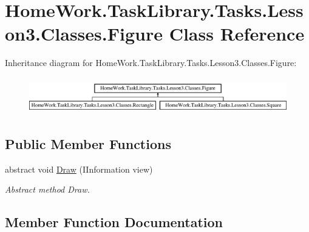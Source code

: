 \hypertarget{class_home_work_1_1_task_library_1_1_tasks_1_1_lesson3_1_1_classes_1_1_figure}{}\section{Home\+Work.\+Task\+Library.\+Tasks.\+Lesson3.\+Classes.\+Figure Class Reference}
\label{class_home_work_1_1_task_library_1_1_tasks_1_1_lesson3_1_1_classes_1_1_figure}
Inheritance diagram for Home\+Work.\+Task\+Library.\+Tasks.\+Lesson3.\+Classes.\+Figure\+:\begin{figure}[H]
\begin{center}
\leavevmode
\includegraphics[height=1.613833cm]{class_home_work_1_1_task_library_1_1_tasks_1_1_lesson3_1_1_classes_1_1_figure}
\end{center}
\end{figure}
\subsection*{Public Member Functions}
\begin{DoxyCompactItemize}
\item 
abstract void \mbox{\hyperlink{class_home_work_1_1_task_library_1_1_tasks_1_1_lesson3_1_1_classes_1_1_figure_acf9c70a78ffb35ca60f070ded3033391}{Draw}} (I\+Information view)
\begin{DoxyCompactList}\small\item\em Abstract method Draw. \end{DoxyCompactList}\end{DoxyCompactItemize}


\subsection{Member Function Documentation}
\mbox{\label{class_home_work_1_1_task_library_1_1_tasks_1_1_lesson3_1_1_classes_1_1_figure_acf9c70a78ffb35ca60f070ded3033391}} 
